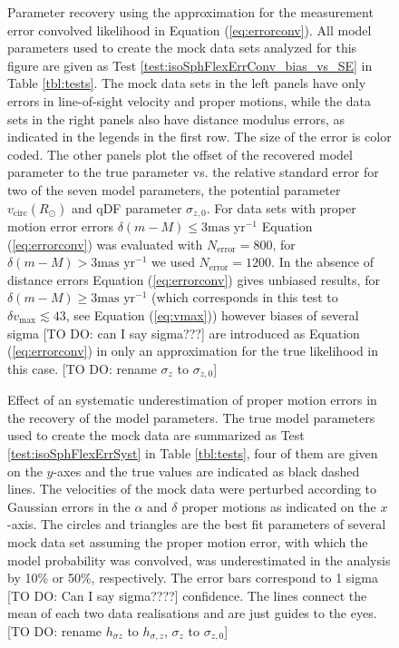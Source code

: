 \addtocounter{figure}{-1}
\begin{figure} [t!]
\caption{Parameter recovery using the approximation for the measurement error convolved likelihood in Equation (\ref{eq:errorconv}). All model parameters used to create the mock data sets analyzed for this figure are given as Test \ref{test:isoSphFlexErrConv_bias_vs_SE} in Table \ref{tbl:tests}. The mock data sets in the left panels have only errors in line-of-sight velocity and proper motions, while the data sets in the right panels also have distance modulus errors, as indicated in the legends in the first row. The size of the error is color coded. The other panels plot the offset of the recovered model parameter to the true parameter vs. the relative standard error for two of the seven model parameters, the potential parameter $v_\text{circ}(R_\odot)$ and qDF parameter $\sigma_{z,0}$. For data sets with proper motion error errors $\delta(m-M) \leq 3 \text{mas yr}^{-1}$ Equation (\ref{eq:errorconv}) was evaluated with $N_\text{error}=800$, for $\delta(m-M) > 3 \text{mas yr}^{-1}$ we used $N_\text{error}=1200$. In the absence of distance errors Equation (\ref{eq:errorconv}) gives unbiased results, for $\delta(m-M) \geq 3 \text{mas yr}^{-1}$ (which corresponds in this test to $\delta v_\text{max} \lesssim 43$, see Equation (\ref{eq:vmax})) however biases of several sigma [TO DO: can I say sigma???] are introduced as Equation (\ref{eq:errorconv}) in only an approximation for the true likelihood in this case. [TO DO: rename  $\sigma_z$ to $\sigma_{z,0}$]}
\label{fig:isoSphFlexErrConv_bias_vs_SE}
\end{figure}





\begin{figure}
\caption{Effect of an systematic underestimation of proper motion errors in the recovery of the model parameters. The true model parameters used to create the mock data are summarized as Test \ref{test:isoSphFlexErrSyst} in Table \ref{tbl:tests}, four of them are given on the $y$-axes and the true values are indicated as black dashed lines. The velocities of the mock data were perturbed according to Gaussian errors in the $\alpha$ and $\delta$ proper motions as indicated on the $x$-axis.   The circles and triangles are the best fit parameters of several mock data set assuming the proper motion error, with which the model probability was convolved, was underestimated in the analysis by 10\% or 50\%, respectively. The error bars correspond to 1 sigma [TO DO: Can I say sigma????] confidence. The lines connect the mean of each two data realisations and are just guides to the eyes. [TO DO: rename $h_{\sigma z}$ to $h_{\sigma,z}$, $\sigma_z$ to $\sigma_{z,0}$]}
\label{fig:isoSphFlexErrSyst}
\end{figure}


